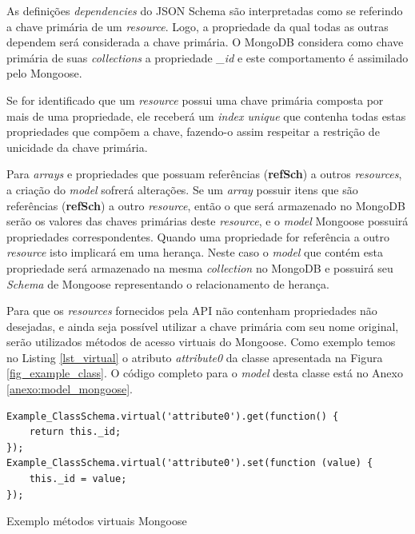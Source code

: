 As definições \textit{dependencies} do JSON Schema são interpretadas como se referindo a chave primária de um \textit{resource}. Logo, a propriedade da qual todas as outras dependem será considerada a chave primária. O MongoDB considera como chave primária de suas \textit{collections} a propriedade \textit{\_id} e este comportamento é assimilado pelo Mongoose.

Se for identificado que um \textit{resource} possui uma chave primária composta por mais de uma propriedade, ele receberá um \textit{index unique} que contenha todas estas propriedades que compõem a chave, fazendo-o assim respeitar a restrição de unicidade da chave primária.

Para \textit{arrays} e propriedades que possuam referências (\textbf{refSch}) a outros \textit{resources}, a criação do \textit{model} sofrerá alterações. Se um \textit{array} possuir itens que são referências (\textbf{refSch}) a outro \textit{resource}, então o que será armazenado no MongoDB serão os valores das chaves primárias deste \textit{resource}, e o \textit{model} Mongoose possuirá propriedades correspondentes. Quando uma propriedade for referência a outro \textit{resource} isto implicará em uma herança. Neste caso o \textit{model} que contém esta propriedade será armazenado na mesma \textit{collection} no MongoDB e possuirá seu \textit{Schema} de Mongoose representando o relacionamento de herança.

Para que os \textit{resources} fornecidos pela API não contenham propriedades não desejadas, e ainda seja possível utilizar a chave primária com seu nome original, serão utilizados métodos de acesso virtuais do Mongoose. Como exemplo temos no Listing \ref{lst_virtual} o atributo \textit{attribute0} da classe apresentada na Figura \ref{fig_example_class}. O código completo para o \textit{model} desta classe está no Anexo \ref{anexo:model_mongoose}.

\begin{listing}
\begin{verbatim}
Example_ClassSchema.virtual('attribute0').get(function() {
    return this._id;
});
Example_ClassSchema.virtual('attribute0').set(function (value) {
    this._id = value;
});
\end{verbatim}
\caption{Exemplo métodos virtuais Mongoose}
\label{lst_virtual}
\end{listing}

